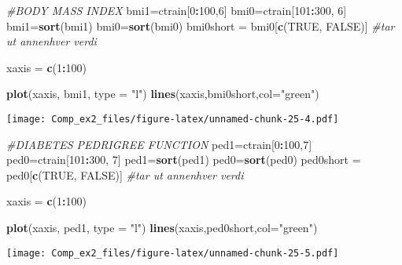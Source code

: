 \documentclass[]{article}
\newenvironment{Shaded}{\begin{snugshade}}{\end{snugshade}}
\newcommand{\KeywordTok}[1]{\textcolor[rgb]{0.13,0.29,0.53}{\textbf{#1}}}
\newcommand{\DataTypeTok}[1]{\textcolor[rgb]{0.13,0.29,0.53}{#1}}
\newcommand{\DecValTok}[1]{\textcolor[rgb]{0.00,0.00,0.81}{#1}}
\newcommand{\StringTok}[1]{\textcolor[rgb]{0.31,0.60,0.02}{#1}}
\newcommand{\CommentTok}[1]{\textcolor[rgb]{0.56,0.35,0.01}{\textit{#1}}}
\newcommand{\OtherTok}[1]{\textcolor[rgb]{0.56,0.35,0.01}{#1}}
\newcommand{\OperatorTok}[1]{\textcolor[rgb]{0.81,0.36,0.00}{\textbf{#1}}}
\newcommand{\NormalTok}[1]{#1}
\begin{document}
\begin{Shaded}
\begin{Highlighting}[]
\CommentTok{#BODY MASS INDEX }
\NormalTok{bmi1=ctrain[}\DecValTok{0}\OperatorTok{:}\DecValTok{100}\NormalTok{,}\DecValTok{6}\NormalTok{]}
\NormalTok{bmi0=ctrain[}\DecValTok{101}\OperatorTok{:}\DecValTok{300}\NormalTok{, }\DecValTok{6}\NormalTok{]}
\NormalTok{bmi1=}\KeywordTok{sort}\NormalTok{(bmi1)}
\NormalTok{bmi0=}\KeywordTok{sort}\NormalTok{(bmi0)}
\NormalTok{bmi0short =}\StringTok{ }\NormalTok{bmi0[}\KeywordTok{c}\NormalTok{(}\OtherTok{TRUE}\NormalTok{, }\OtherTok{FALSE}\NormalTok{)] }\CommentTok{#tar ut annenhver verdi }

\NormalTok{xaxis =}\StringTok{ }\KeywordTok{c}\NormalTok{(}\DecValTok{1}\OperatorTok{:}\DecValTok{100}\NormalTok{)}

\KeywordTok{plot}\NormalTok{(xaxis, bmi1, }\DataTypeTok{type =} \StringTok{"l"}\NormalTok{)}
\KeywordTok{lines}\NormalTok{(xaxis,bmi0short,}\DataTypeTok{col=}\StringTok{"green"}\NormalTok{)}
\end{Highlighting}
\end{Shaded}

\texttt{[image: Comp\_ex2\_files/figure-latex/unnamed-chunk-25-4.pdf]}

\begin{Shaded}
\begin{Highlighting}[]
\CommentTok{#DIABETES PEDRIGREE FUNCTION }
\NormalTok{ped1=ctrain[}\DecValTok{0}\OperatorTok{:}\DecValTok{100}\NormalTok{,}\DecValTok{7}\NormalTok{]}
\NormalTok{ped0=ctrain[}\DecValTok{101}\OperatorTok{:}\DecValTok{300}\NormalTok{, }\DecValTok{7}\NormalTok{]}
\NormalTok{ped1=}\KeywordTok{sort}\NormalTok{(ped1)}
\NormalTok{ped0=}\KeywordTok{sort}\NormalTok{(ped0)}
\NormalTok{ped0short =}\StringTok{ }\NormalTok{ped0[}\KeywordTok{c}\NormalTok{(}\OtherTok{TRUE}\NormalTok{, }\OtherTok{FALSE}\NormalTok{)] }\CommentTok{#tar ut annenhver verdi }

\NormalTok{xaxis =}\StringTok{ }\KeywordTok{c}\NormalTok{(}\DecValTok{1}\OperatorTok{:}\DecValTok{100}\NormalTok{)}

\KeywordTok{plot}\NormalTok{(xaxis, ped1, }\DataTypeTok{type =} \StringTok{"l"}\NormalTok{)}
\KeywordTok{lines}\NormalTok{(xaxis,ped0short,}\DataTypeTok{col=}\StringTok{"green"}\NormalTok{)}
\end{Highlighting}
\end{Shaded}

\texttt{[image: Comp\_ex2\_files/figure-latex/unnamed-chunk-25-5.pdf]}
\end{document}
